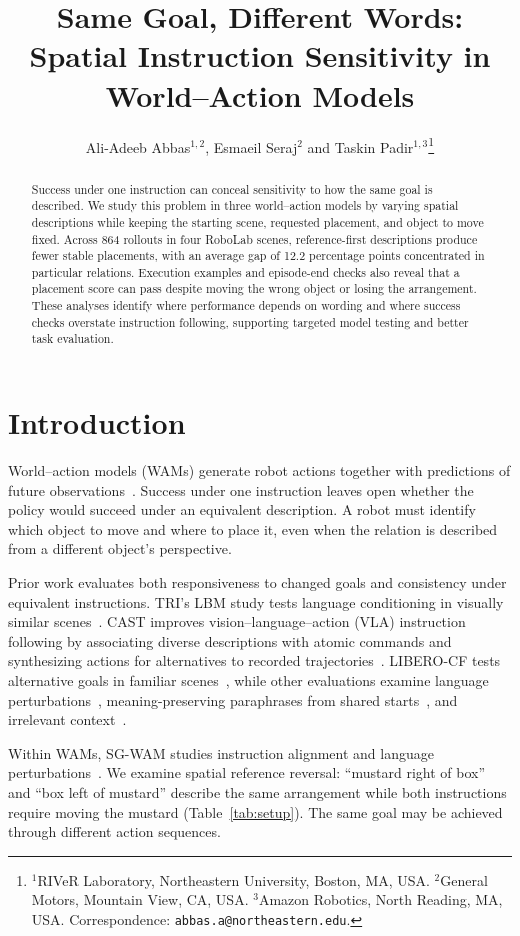 \documentclass{article}
\title{Same Goal, Different Words:\\Spatial Instruction Sensitivity in World--Action Models}
\author{Ali-Adeeb Abbas$^{1,2}$, Esmaeil Seraj$^2$ and Taskin Padir$^{1,3}$\thanks{$^1$RIVeR Laboratory, Northeastern University, Boston, MA, USA. $^2$General Motors, Mountain View, CA, USA. $^3$Amazon Robotics, North Reading, MA, USA. Correspondence: \texttt{abbas.a@northeastern.edu}.}}
\begin{document}
\maketitle
\begin{abstract}
Success under one instruction can conceal sensitivity to how the same goal is described. We study this problem in three world--action models by varying spatial descriptions while keeping the starting scene, requested placement, and object to move fixed. Across 864 rollouts in four RoboLab scenes, reference-first descriptions produce fewer stable placements, with an average gap of 12.2 percentage points concentrated in particular relations. Execution examples and episode-end checks also reveal that a placement score can pass despite moving the wrong object or losing the arrangement. These analyses identify where performance depends on wording and where success checks overstate instruction following, supporting targeted model testing and better task evaluation.
\end{abstract}

\section{Introduction}
World--action models (WAMs) generate robot actions together with predictions of future observations~\citep{kim2026cosmospolicy}. Success under one instruction leaves open whether the policy would succeed under an equivalent description. A robot must identify which object to move and where to place it, even when the relation is described from a different object's perspective.

Prior work evaluates both responsiveness to changed goals and consistency under equivalent instructions. TRI's LBM study tests language conditioning in visually similar scenes~\citep{tri2025lbm}. CAST improves vision--language--action (VLA) instruction following by associating diverse descriptions with atomic commands and synthesizing actions for alternatives to recorded trajectories~\citep{glossop2025cast}. LIBERO-CF tests alternative goals in familiar scenes~\citep{fang2026counterfactual}, while other evaluations examine language perturbations~\citep{fei2026liberoplus}, meaning-preserving paraphrases from shared starts~\citep{kim2026liberopara}, and irrelevant context~\citep{moskalenko2026bring}.

Within WAMs, SG-WAM studies instruction alignment and language perturbations~\citep{he2026sgwam}. We examine spatial reference reversal: ``mustard right of box'' and ``box left of mustard'' describe the same arrangement while both instructions require moving the mustard (Table~\ref{tab:setup}). The same goal may be achieved through different action sequences.
\end{document}
